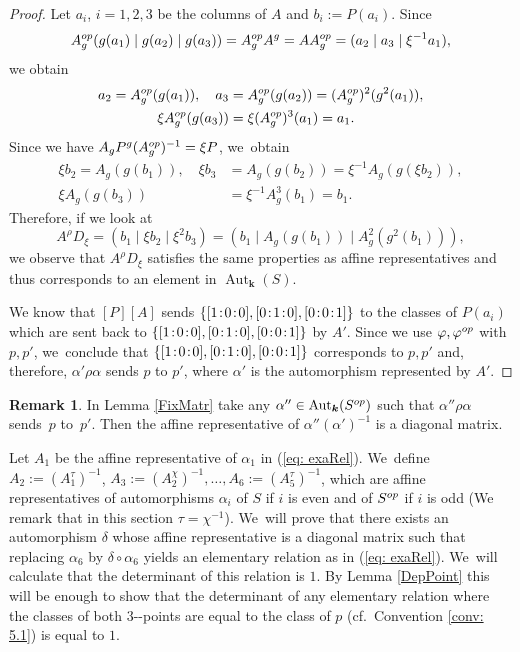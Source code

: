 \documentclass[10pt,a4paper]{amsart}
\newcommand{\cf}{cf.\ }
\providecommand{\nobreakdash}{\nobreak\hbox{-}}
\newcommand{\op}{\textup{op}}
\newcommand{\sep}{\mkern2mu{:}\mkern2mu}
\theoremstyle{definition}
\newtheorem{remark}[theorem]{Remark}
\newcommand{\kk}{{\boldsymbol{k}}}
\DeclareMathOperator{\Aut}{Aut}
\begin{document}
\begin{proof}
Let $a_i$, $i=1,2,3$ be the columns of $A$ and $b_i := P(a_i)$. Since
\[
A_g^{\op}(g(a_1) \mid g(a_2) \mid g(a_3)) = A_g^{\op} A^g = A A_g^{\op} = (a_2 \mid a_3 \mid \xi^{-1} a_1),
\]
we obtain
\begin{align*}
a_2 = A_g^{\op}(g(a_1)),\quad
a_3 &= A_g^{\op} (g(a_2)) = (A_g^{\op})^2(g^2(a_1)),\\
\xi A_g^{\op}(g(a_3)) &= \xi (A_g^{\op})^3 (a_1) = a_1.
\end{align*}
Since we have $A_g P^g (A_g^{\op})^{-1} = \xi P$, we~obtain
\begin{align*}
\xi b_2 = A_g(g(b_1)),
\quad
\xi b_3 &= A_g(g(b_2)) = \xi^{-1} A_g(g(\xi b_2)),
\\
\xi A_g(g(b_3)) &= \xi^{-1} A_g^3(b_1) = b_1.
\end{align*}
Therefore, if we look at
\[
A^{\rho} D_{\xi} = (b_1 \mid \xi b_2 \mid \xi^2 b_3) = (b_1 \mid A_g(g(b_1)) \mid A_g^2(g^2(b_1))),
\]
we observe that $A^{\rho} D_{\xi}$ satisfies the same properties as affine representatives and thus corresponds to an element in $\Aut_{\kk}(S)$.

We know that $[P] [A]$ sends $\{ [1\sep 0\sep 0], [0\sep 1\sep 0],[0\sep 0\sep 1]\}$ to the classes of $P(a_i)$ which are sent back to $\{ [1\sep 0\sep 0], [0\sep 1\sep 0],[0\sep 0\sep 1]\}$ by $A'$. Since we use $\varphi, \varphi^{\op}$ with $p,p'$, we~conclude that $\{ [1\sep 0\sep 0], [0\sep 1\sep 0],[0\sep 0\sep 1]\}$ corresponds to $p,p'$ and, therefore, $\alpha' \rho \alpha$ sends $p$ to $p'$, where $\alpha'$ is the automorphism represented by $A'$.
\end{proof}
\begin{remark}
In Lemma \ref{FixMatr} take any $\alpha'' \in \Aut_{\kk}(S^{\op})$ such that $\alpha'' \rho \alpha$ sends~$p$ to~$p'$. Then the affine representative of $\alpha''(\alpha')^{-1}$ is a diagonal matrix.
\end{remark}
Let $A_1$ be the affine representative of $\alpha_1$ in (\ref{eq: exaRel}). We~define $A_2 := (A_1^{\tau})^{-1}$, $A_3 := (A_2^{\chi})^{-1}, \dots , A_6 := (A_5^{\tau})^{-1}$, which are affine representatives of automorphisms $\alpha_i$ of $S$ if $i$ is even and of $S^{\op}$ if $i$ is odd (We remark that in this section $\tau = \chi^{-1}$). We~will prove that there exists an automorphism $\delta$ whose affine representative is a diagonal matrix such that replacing $\alpha_6$ by $\delta \circ \alpha_6$ yields an elementary relation as in (\ref{eq: exaRel}). We~will calculate that the determinant of this relation is $1$. By Lemma \ref{DepPoint} this will be enough to show that the determinant of any elementary relation where the classes of both $3$\nobreakdash-points are equal to the class of $p$ (\cf Convention \ref{conv: 5.1}) is equal to $1$.\enlargethispage{-4\baselineskip}
\end{document}

